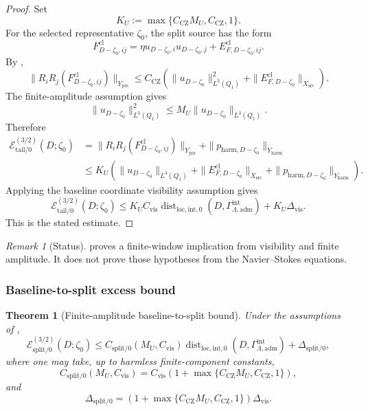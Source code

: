 \documentclass[11pt]{article}
\numberwithin{equation}{section}
\newtheorem{theorem}{Theorem}[section]
\theoremstyle{definition}
\theoremstyle{remark}
\newtheorem{remark}[remark]{Remark}
\newcommand{\loc}{\mathrm{loc}}
\newcommand{\intg}{\mathrm{int}}
\newcommand{\tail}{\mathrm{tail}}
\newcommand{\spl}{\mathrm{split}}
\newcommand{\adm}{\mathrm{adm}}
\newcommand{\prs}{\mathrm{prs}}
\newcommand{\harm}{\mathrm{harm}}
\newcommand{\src}{\mathrm{src}}
\newcommand{\cl}{\mathrm{cl}}
\newcommand{\CZ}{\mathrm{CZ}}
\newcommand{\Dist}{\operatorname{dist}}
\newcommand{\calE}{\mathcal E}
\newcommand{\Gammaadm}{\Gamma^{\intg}_{\Lambda,\adm}}
\begin{document}
\begin{proof}
Set
\[
    K_U:=\max\{C_{\CZ}M_U,C_{\CZ},1\}.
\]
For the selected representative \(\zeta_0\), the split source has the form
\[
    F^{\cl}_{D-\zeta_0,ij}
    =
    \eta u_{D-\zeta_0,i}u_{D-\zeta_0,j}
    +
    E^{\cl}_{F,D-\zeta_0,ij}.
\]
By ,
\[
    \|R_iR_j(F^{\cl}_{D-\zeta_0,ij})\|_{Y_{\prs}}
    \le
    C_{\CZ}
    \left(
        \|u_{D-\zeta_0}\|_{L^3(Q_1)}^2
        +
        \|E^{\cl}_{F,D-\zeta_0}\|_{X_{\src}}
    \right).
\]
The finite-amplitude assumption gives
\[
    \|u_{D-\zeta_0}\|_{L^3(Q_1)}^2
    \le
    M_U\|u_{D-\zeta_0}\|_{L^3(Q_1)}.
\]
Therefore
\[
\begin{aligned}
    \calE_{\tail/0}^{(3/2)}(D;\zeta_0)
    &=
    \|R_iR_j(F^{\cl}_{D-\zeta_0,ij})\|_{Y_{\prs}}
    +
    \|p_{\harm,D-\zeta_0}\|_{Y_{\harm}}
\\
    &\le
    K_U
    \left(
        \|u_{D-\zeta_0}\|_{L^3(Q_1)}
        +
        \|E^{\cl}_{F,D-\zeta_0}\|_{X_{\src}}
        +
        \|p_{\harm,D-\zeta_0}\|_{Y_{\harm}}
    \right).
\end{aligned}
\]
Applying the baseline coordinate visibility assumption gives
\[
    \calE_{\tail/0}^{(3/2)}(D;\zeta_0)
    \le
    K_U C_{\mathrm{vis}}
    \Dist_{\loc,\intg,0}(D,\Gammaadm)
    +
    K_U\Delta_{\mathrm{vis}}.
\]
This is the stated estimate.
\end{proof}

\begin{remark}[Status]
 proves a finite-window implication from
visibility and finite amplitude.  It does not prove those hypotheses from the
Navier--Stokes equations.
\end{remark}

\subsubsection{Baseline-to-split excess bound}
\label{sec:split-bound}

\begin{theorem}[Finite-amplitude baseline-to-split bound]
\label{thm:baseline-to-split-working}
Under the assumptions of ,
\[
    \calE_{\spl/0}^{(3/2)}(D;\zeta_0)
    \le
    C_{\spl/0}(M_U,C_{\mathrm{vis}})
    \Dist_{\loc,\intg,0}(D,\Gammaadm)
    +
    \Delta_{\spl/0},
\]
where one may take, up to harmless finite-component constants,
\[
    C_{\spl/0}(M_U,C_{\mathrm{vis}})
    =
    C_{\mathrm{vis}}
    \left(1+\max\{C_{\CZ}M_U,C_{\CZ},1\}\right),
\]
and
\[
    \Delta_{\spl/0}
    =
    \left(1+\max\{C_{\CZ}M_U,C_{\CZ},1\}\right)
    \Delta_{\mathrm{vis}}.
\]
\end{theorem}
\end{document}
